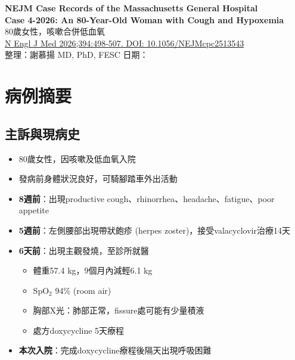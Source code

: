 \documentclass[12pt,a4paper]{article}
\begin{document}
\begin{center}
{\LARGE\bfseries\textcolor{emergency_red}{NEJM Case Records of the Massachusetts General Hospital}}\\[0.5cm]
{\Large\textbf{Case 4-2026: An 80-Year-Old Woman with Cough and Hypoxemia}}\\[0.3cm]
{\large 80歲女性，咳嗽合併低血氧}\\[0.5cm]
{\normalsize \href{https://doi.org/10.1056/NEJMcpc2513543}{N Engl J Med 2026;394:498-507. DOI: 10.1056/NEJMcpc2513543}}\\[0.3cm]
{\normalsize 整理：謝慕揚 MD, PhD, FESC \quad 日期：\mydate}
\end{center}

\vspace{0.5cm}

\section{病例摘要}

\subsection{主訴與現病史}
\begin{itemize}
    \item 80歲女性，因咳嗽及低血氧入院
    \item 發病前身體狀況良好，可騎腳踏車外出活動
    \item \textbf{8週前}：出現productive cough、rhinorrhea、headache、fatigue、poor appetite
    \item \textbf{5週前}：左側腰部出現帶狀皰疹 (herpes zoster)，接受valacyclovir治療14天
    \item \textbf{6天前}：出現主觀發燒，至診所就醫
    \begin{itemize}
        \item 體重57.4 kg，9個月內減輕6.1 kg
        \item SpO$_2$ 94\% (room air)
        \item 胸部X光：肺部正常，fissure處可能有少量積液
        \item 處方doxycycline 5天療程
    \end{itemize}
    \item \textbf{本次入院}：完成doxycycline療程後隔天出現呼吸困難
\end{itemize}
\end{document}
